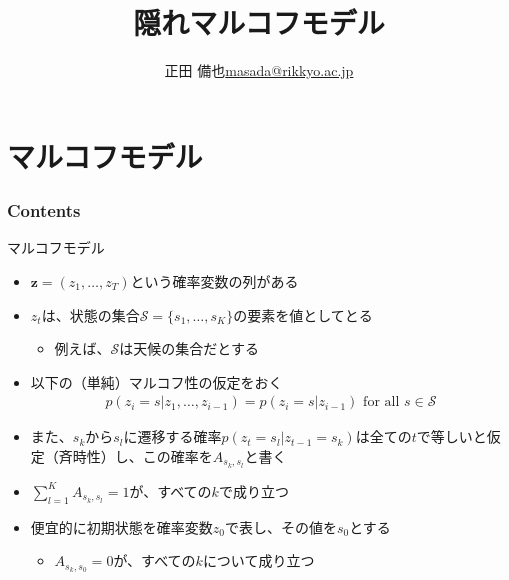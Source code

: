 \documentclass[aspectratio=169,unicode,dvipdfmx,14pt]{beamer}
\title{ \\隠れマルコフモデル}
\author{\texorpdfstring{正田 備也\newline\href{mailto:masada@rikkyo.ac.jp}{masada@rikkyo.ac.jp}}{正田 備也}}
\date{}
\begin{document}
\begin{frame}
\titlepage
\end{frame}

\section{マルコフモデル}

\begin{frame}\frametitle{Contents}
\Large \tableofcontents[currentsection]
\end{frame}

\begin{frame}{マルコフモデル}
\vspace{-.1in}
\begin{itemize}
\item $\bm{z} = (z_1,\ldots,z_T)$という確率変数の列がある
\item $z_t$は、状態の集合$\mathcal{S} = \{ s_1, \ldots, s_K \}$の要素を値としてとる
\begin{itemize}
\item 例えば、$\mathcal{S}$は天候の集合だとする
\end{itemize}
\item 以下の（単純）マルコフ性の仮定をおく
\vspace{-.1in}
\begin{align}
p(z_i =s | z_1,\ldots, z_{i-1}) = p(z_i =s | z_{i-1}) \mbox{ for all $s \in \mathcal{S}$}
\end{align}
\item また、$s_k$から$s_l$に遷移する確率$p(z_t=s_l|z_{t-1}=s_k)$は全ての$t$で等しいと仮定（斉時性）し、この確率を$A_{s_k,s_l}$と書く
\item $\sum_{l=1}^K A_{s_k, s_l} = 1$が、すべての$k$で成り立つ
\item 便宜的に初期状態を確率変数$z_0$で表し、その値を$s_0$とする
\begin{itemize}
\item $A_{s_k,s_0} = 0$が、すべての$k$について成り立つ
\end{itemize}
\end{itemize}
\end{frame}
\end{document}
